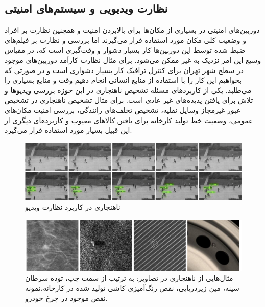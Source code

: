 \documentclass[12pt,a4paper]{report}
\begin{document}
\subsection{نظارت ویدیویی و سیستم‌های امنیتی}
دوربین‌های امنیتی در بسیاری از مکان‌ها برای بالابردن امنیت و همچنین نظارت بر افراد و وضعیت کلی مکان مورد استفاده قرار می‌گیرند اما بررسی و نظارت بر فیلم‌های ضبط شده توسط این دوربین‌ها کار بسیار دشوار و وقت‌گیری است که، در مقیاس وسیع این امر نزدیک به غیر ممکن می‌شود. برای مثال نظارت کار‌آمد دوربین‌های موجود در سطح شهر تهران برای کنترل ترافیک کار بسیار دشواری است و در صورتی که بخواهیم این کار را با استفاده از منابع انسانی انجام دهیم وقت و منابع بسیاری را می‌طلبد. یکی از کاربرد‌های مسئله تشخیص ناهنجاری در این حوزه بررسی ویدیو‌ها و تلاش برای یافتن پدیده‌های غیر عادی است. برای مثال تشخیص ناهنجاری در تشخیص عبور غیرمجاز وسایل نقلیه، تشخیص تخلف‌های رانندگی، بررسی امنیت مکان‌های عمومی، وضعیت خط تولید کارخانه برای یافتن کالاهای معیوب و کاربرد‌های دیگری از این قبیل بسیار مورد استفاده قرار می‌گیرد.
\begin{figure}[!hp]
	\begin{center}
		\includegraphics[width=\linewidth]{./images/figures/walkway-anomaly.png}
		\caption{ناهنجاری در کاربرد نظارت ویدیو~\cite{10.1016/j.compeleceng.2019.02.017}}
		\label{fig:walkway-anomaly}
	\end{center}
\end{figure}

\begin{figure}[!hp]
	\begin{center}
		\includegraphics[width=\linewidth]{./images/figures/image-anomaly-examples-1.png}

		\caption{
		مثال‌هایی از ناهنجاری در تصاویر: به ترتیب از سمت چپ، توده سرطان سینه، مین زیر‌دریایی، نقص رنگ‌آمیزی کاشی تولید شده در کارخانه،نمونه نقص موجود در چرخ خودرو.
		\cite{T.Ehret}
		}		
		\label{fig:anomaly-example-1}
		\centering
	\end{center}
\end{figure}
\end{document}
